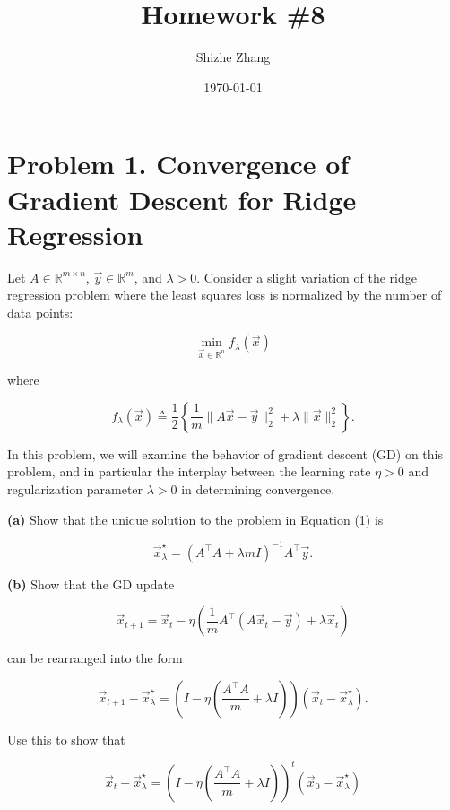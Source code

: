 \documentclass[
  12pt,
]{fphw}
\title{Homework \#8} %
\author{Shizhe Zhang} %
\date{\today} %
\institute{University of California, Berkeley \\ Department of Statistics} %
\begin{document}
\maketitle %


\section*{Problem 1. Convergence of Gradient Descent for Ridge Regression}

Let $A \in \mathbb{R}^{m \times n}$, $\vec{y} \in \mathbb{R}^{m}$, and $\lambda > 0$. Consider a slight variation of the ridge regression problem where the least squares loss is normalized by the number of data points:

\[
\min_{\vec{x}\in\mathbb{R}^{n}} f_\lambda(\vec{x})
\]

where

\[
f_\lambda(\vec{x}) \triangleq \frac12 \left\{ \frac1m \|A\vec{x}-\vec{y}\|_2^2 + \lambda \|\vec{x}\|_2^2
\right\}.
\tag{1}
\]

In this problem, we will examine the behavior of gradient descent (GD) on this problem, and in particular the interplay between the learning rate $\eta > 0$ and regularization parameter $\lambda > 0$ in determining convergence.


\textbf{(a)}
Show that the unique solution to the problem in Equation (1) is

\[
\vec{x}_\lambda^\star = (A^\top A + \lambda m I)^{-1} A^\top \vec{y}.
\tag{2}
\]

\textbf{(b)}
Show that the GD update

\[
\vec{x}_{t+1} = \vec{x}_t - \eta \left( \frac1m A^\top(A\vec{x}_t - \vec{y}) + \lambda \vec{x}_t
\right)
\tag{3}
\]

can be rearranged into the form

\[
\vec{x}_{t+1}-\vec{x}_\lambda^\star = \left( I - \eta \left( \frac{A^\top A}{m} + \lambda I \right) \right) (\vec{x}_t-\vec{x}_\lambda^\star).
\tag{4}
\]

Use this to show that

\[
\vec{x}_t-\vec{x}_\lambda^\star = \left( I - \eta \left( \frac{A^\top A}{m} + \lambda I \right) \right)^t (\vec{x}_0-\vec{x}_\lambda^\star)
\tag{5}
\]
\end{document}
